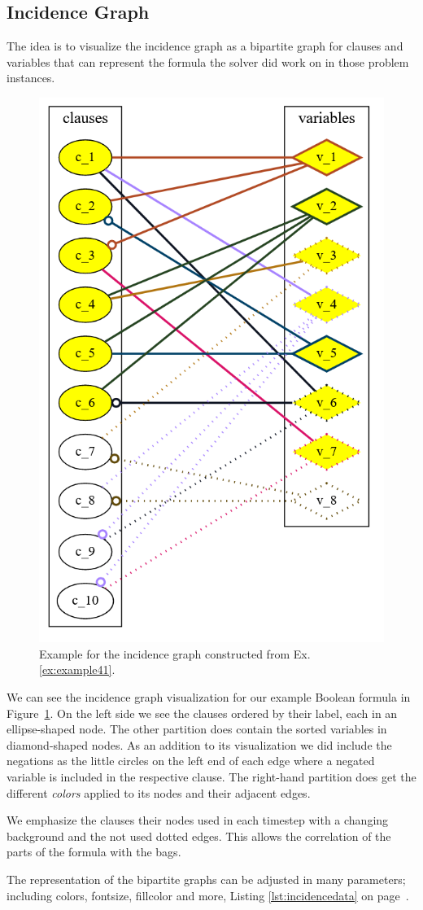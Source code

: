 \documentclass[a4paper, 12pt, bibliography=totoc]{scrartcl}
\begin{document}
\subsection{Incidence Graph}\label{sec:incid}

The idea is to visualize the incidence graph as a bipartite graph for clauses and variables that can represent the formula the solver did work on in those problem instances.

\begin{figure}[H]
	\centering
	\includegraphics[width=0.4\linewidth]{images/IncidenceStep6.png}
	\caption{Example for the incidence graph constructed from Ex. \ref{ex:example41}.}
	\label{fig:incidencestep6}
\end{figure}

 We can see the incidence graph visualization for our example Boolean formula in Figure~\ref{fig:incidencestep6}. On the left side we see the clauses ordered by their label, each in an ellipse-shaped node. The other partition does contain the sorted variables in diamond-shaped nodes. As an addition to its visualization we did include the negations as the little circles on the left end of each edge where a negated variable is included in the respective clause. The right-hand partition does get the different \textit{colors} applied to its nodes and their adjacent edges.
 
 We emphasize the clauses their nodes used in each timestep with a changing background and the not used dotted edges. This allows the correlation of the  parts of the formula with the bags.  

The representation of the bipartite graphs can be adjusted in many parameters; including colors, fontsize, fillcolor and more, Listing \ref{lst:incidencedata} on page~\pageref{lst:incidencedata}.
\end{document}
